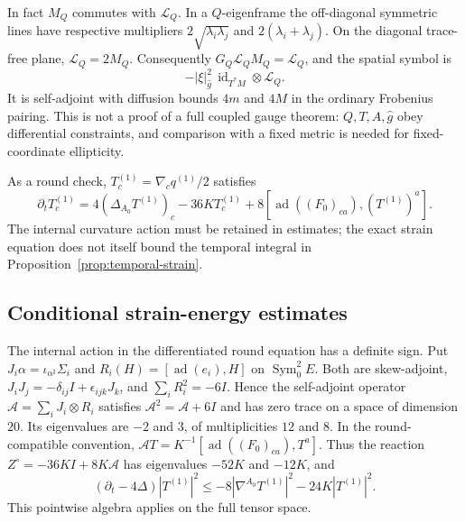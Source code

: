 \documentclass[11pt]{article}
\numberwithin{equation}{section}
\theoremstyle{definition}
\theoremstyle{remark}
\DeclareMathOperator{\Sym}{Sym}
\newcommand{\id}{\operatorname{id}}
\begin{document}
In fact $M_Q$ commutes with $\mathscr L_Q$. In a $Q$-eigenframe the
off-diagonal symmetric lines have respective multipliers
$2\sqrt{\lambda_i\lambda_j}$ and $2(\lambda_i+\lambda_j)$.
On the diagonal trace-free plane, $\mathscr L_Q=2M_Q$.
Consequently $G_Q\mathscr L_QM_Q=\mathscr L_Q$, and the spatial symbol is
\[
 -|\xi|_{\widehat g}^2\,\id_{T^*M}\otimes\mathscr L_Q.
\]
It is self-adjoint with diffusion bounds $4m$ and $4M$ in the ordinary
Frobenius pairing. This is not a proof of a full coupled gauge theorem:
$Q,T,A,\widehat g$ obey differential constraints, and comparison with a
fixed metric is needed for fixed-coordinate ellipticity.

As a round check, $T_c^{(1)}=\nabla_cq^{(1)}/2$ satisfies
\[
 \partial_tT_c^{(1)}=4(\Delta_{A_0}T^{(1)})_c-36KT_c^{(1)}
              +8[\operatorname{ad}((F_0)_{ca}),(T^{(1)})^a].
\]
The internal curvature action must be retained in estimates; the exact
strain equation does not itself bound the temporal integral in
Proposition~\ref{prop:temporal-strain}.

\subsection{Conditional strain-energy estimates}
\label{subsec:strain-energy}

The internal action in the differentiated round equation has a definite
sign. Put $J_i\alpha=\iota_{\alpha^\sharp}\Sigma_i$ and
$R_i(H)=[\operatorname{ad}(e_i),H]$ on $\Sym^2_0E$. Both are skew-adjoint,
$J_iJ_j=-\delta_{ij}I+\epsilon_{ijk}J_k$, and
$\sum_iR_i^2=-6I$. Hence the self-adjoint operator
$\mathcal A=\sum_iJ_i\otimes R_i$ satisfies
$\mathcal A^2=\mathcal A+6I$ and has zero trace on a space of dimension
$20$. Its eigenvalues are $-2$ and $3$, of multiplicities $12$ and $8$.
In the round-compatible convention,
$\mathcal A T=K^{-1}[\operatorname{ad}((F_0)_{ca}),T^a]$.
Thus the reaction $Z^\circ=-36KI+8K\mathcal A$ has eigenvalues
$-52K$ and $-12K$, and
\[
 (\partial_t-4\Delta)|T^{(1)}|^2
 \leq-8|\nabla^{A_0}T^{(1)}|^2-24K|T^{(1)}|^2.
\]
This pointwise algebra applies on the full tensor space.
\end{document}
